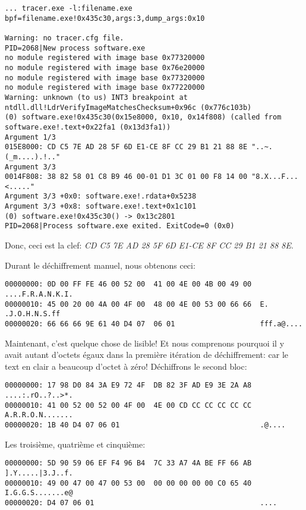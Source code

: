 \begin{lstlisting}
... tracer.exe -l:filename.exe bpf=filename.exe!0x435c30,args:3,dump_args:0x10

Warning: no tracer.cfg file.
PID=2068|New process software.exe
no module registered with image base 0x77320000
no module registered with image base 0x76e20000
no module registered with image base 0x77320000
no module registered with image base 0x77220000
Warning: unknown (to us) INT3 breakpoint at ntdll.dll!LdrVerifyImageMatchesChecksum+0x96c (0x776c103b)
(0) software.exe!0x435c30(0x15e8000, 0x10, 0x14f808) (called from software.exe!.text+0x22fa1 (0x13d3fa1))
Argument 1/3
015E8000: CD C5 7E AD 28 5F 6D E1-CE 8F CC 29 B1 21 88 8E "..~.(_m....).!.."
Argument 3/3
0014F808: 38 82 58 01 C8 B9 46 00-01 D1 3C 01 00 F8 14 00 "8.X...F...<....."
Argument 3/3 +0x0: software.exe!.rdata+0x5238
Argument 3/3 +0x8: software.exe!.text+0x1c101
(0) software.exe!0x435c30() -> 0x13c2801
PID=2068|Process software.exe exited. ExitCode=0 (0x0)
\end{lstlisting}

Donc, ceci est la clef: \emph{CD C5 7E AD 28 5F 6D E1-CE 8F CC 29 B1 21 88 8E}.

Durant le déchiffrement manuel, nous obtenons ceci:

\begin{lstlisting}
00000000: 0D 00 FF FE 46 00 52 00  41 00 4E 00 4B 00 49 00  ....F.R.A.N.K.I.
00000010: 45 00 20 00 4A 00 4F 00  48 00 4E 00 53 00 66 66  E. .J.O.H.N.S.ff
00000020: 66 66 66 9E 61 40 D4 07  06 01                    fff.a@....
\end{lstlisting}

Maintenant, c'est quelque chose de lisible!
Et nous comprenons pourquoi il y avait autant d'octets égaux dans la première
itération de déchiffrement:
car le text en clair a beaucoup d'octet à zéro!
Déchiffrons le second bloc:

\begin{lstlisting}
00000000: 17 98 D0 84 3A E9 72 4F  DB 82 3F AD E9 3E 2A A8  ....:.rO..?..>*.
00000010: 41 00 52 00 52 00 4F 00  4E 00 CD CC CC CC CC CC  A.R.R.O.N.......
00000020: 1B 40 D4 07 06 01                                 .@....
\end{lstlisting}

Les troisième, quatrième et cinquième:

\begin{lstlisting}
00000000: 5D 90 59 06 EF F4 96 B4  7C 33 A7 4A BE FF 66 AB  ].Y.....|3.J..f.
00000010: 49 00 47 00 47 00 53 00  00 00 00 00 00 C0 65 40  I.G.G.S.......e@
00000020: D4 07 06 01                                       ....
\end{lstlisting}


